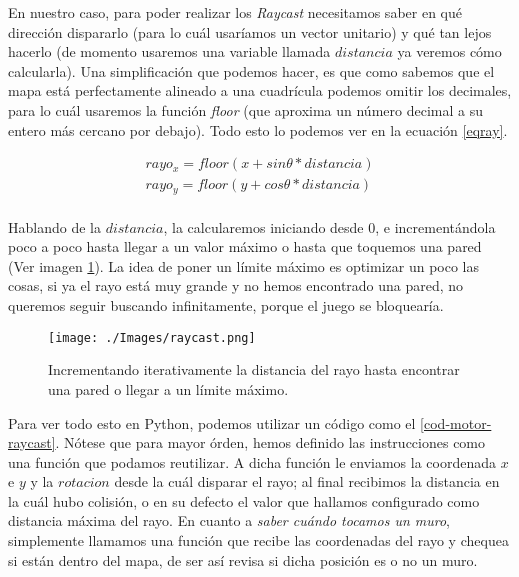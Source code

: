 En nuestro caso, para poder realizar los \emph{Raycast} necesitamos saber en qué dirección dispararlo (para lo cuál usaríamos un vector unitario) y qué tan lejos hacerlo (de momento usaremos una variable llamada $distancia$ ya veremos cómo calcularla). Una simplificación que podemos hacer, es que como sabemos que el mapa está perfectamente alineado a una cuadrícula podemos omitir los decimales, para lo cuál usaremos la función \emph{floor} (que aproxima un número decimal a su entero más cercano por debajo). Todo esto lo podemos ver en la ecuación \ref{eqray}.

\begin{equation}
\begin{aligned}
\label{eqray}
rayo_x = floor(x + sin \theta * distancia)\\
rayo_y = floor(y + cos \theta * distancia)\\
\end{aligned}
\end{equation}

Hablando de la $distancia$, la calcularemos iniciando desde 0, e incrementándola poco a poco hasta llegar a un valor máximo o hasta que toquemos una pared (Ver imagen \ref{raycastit}). La idea de poner un límite máximo es optimizar un poco las cosas, si ya el rayo está muy grande y no hemos encontrado una pared, no queremos seguir buscando infinitamente, porque el juego se bloquearía.

\begin{figure}[h!]
	\centering
	\texttt{[image: ./Images/raycast.png]}
	\caption{Incrementando iterativamente la distancia del rayo hasta encontrar una pared o llegar a un límite máximo.}
	\label{raycastit}
\end{figure}

Para ver todo esto en Python, podemos utilizar un código como el \ref{cod-motor-raycast}. Nótese que para mayor órden, hemos definido las instrucciones como una función que podamos reutilizar. A dicha función le enviamos la coordenada $x$ e $y$ y la $rotacion$ desde la cuál disparar el rayo; al final recibimos la distancia en la cuál hubo colisión, o en su defecto el valor que hallamos configurado como distancia máxima del rayo. En cuanto a \emph{saber cuándo tocamos un muro}, simplemente llamamos una función que recibe las coordenadas del rayo y chequea si están dentro del mapa, de ser así revisa si dicha posición es o no un muro.



